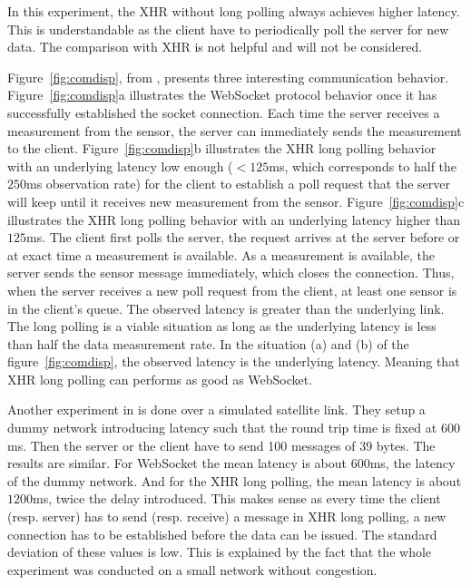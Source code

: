 \documentclass[journal,compsoc]{IEEEtran}
\newcommand{\ws}{WebSocket}
\begin{document}
In this experiment, the XHR without long polling always achieves higher latency.
This is understandable as the client have to periodically poll the server for new data.
The comparison with XHR is not helpful and will not be considered.

Figure~\ref{fig:comdisp}, from \cite{communicationAndDIsplayingRealTimeDataWithWebSocket}, presents three interesting communication behavior.
Figure~\ref{fig:comdisp}a illustrates the \ws{} protocol behavior once it has successfully established the socket connection. Each time the server receives a measurement from the sensor, the server can immediately sends the measurement to the client.
Figure~\ref{fig:comdisp}b illustrates the XHR long polling behavior with an underlying latency low enough ($< 125 $ms, which corresponds to half the $250$ms observation rate) for the client to establish a poll request that the server will keep until it receives new measurement from the sensor.
Figure~\ref{fig:comdisp}c illustrates the XHR long polling behavior with an underlying latency higher than $125$ms.
The client first polls the server, the request arrives at the server before or at exact time a measurement is available.
As a measurement is available, the server sends the sensor message immediately, which closes the connection.
Thus, when the server receives a new poll request from the client, at least one sensor is in the client's queue.
The observed latency is greater than the underlying link.
The long polling is a viable situation as long as the underlying latency is less than half the data measurement rate.
In the situation (a) and (b) of the figure~\ref{fig:comdisp}, the observed latency is the underlying latency.
Meaning that XHR long polling can performs as good as \ws{}.



Another experiment in \cite{collinalatency} is done over a simulated satellite link. They setup a dummy network introducing latency such that the round trip time is fixed at $600$ms.
Then the server or the client have to send 100 messages of 39 bytes. The results are similar.
For \ws{} the mean latency is about $600$ms, the latency of the dummy network. And for the XHR long polling, the mean latency is about $1200$ms, twice the delay introduced.
This makes sense as every time the client (resp. server) has to send (resp. receive) a message in XHR long polling, a new connection has to be established before the data can be issued.
The standard deviation of these values is low.
This is explained by the fact that the whole experiment was conducted on a small network without congestion.
\end{document}
